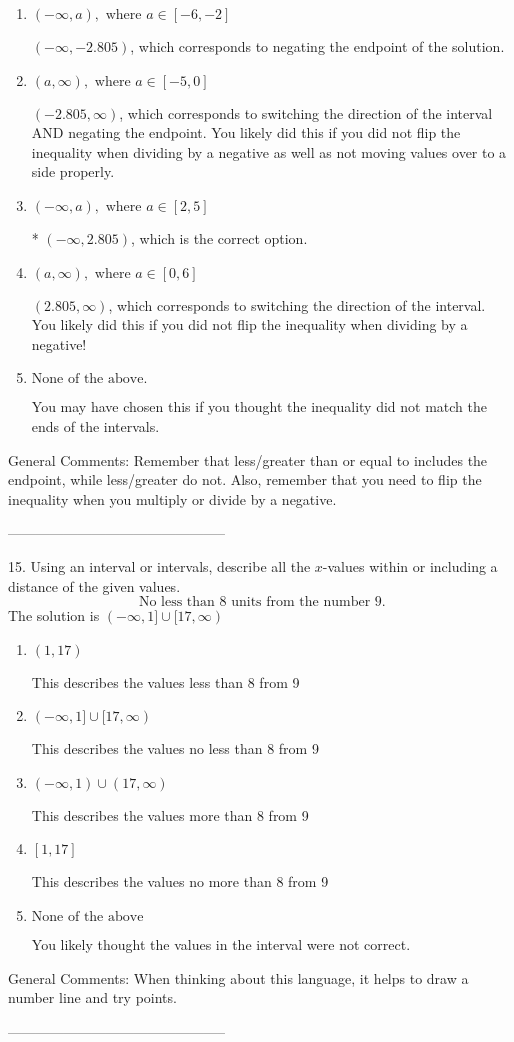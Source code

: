 \documentclass{article}[14pt]
\begin{document}
\begin{enumerate}[label=\Alph*.] 
\item $ (-\infty, a), \text{ where } a \in [-6, -2] $ 

  $(-\infty, -2.805)$, which corresponds to negating the endpoint of the solution. 
\item $ (a, \infty), \text{ where } a \in [-5, 0] $ 

  $(-2.805, \infty)$, which corresponds to switching the direction of the interval AND negating the endpoint. You likely did this if you did not flip the inequality when dividing by a negative as well as not moving values over to a side properly. 
\item $ (-\infty, a), \text{ where } a \in [2, 5] $ 

 * $(-\infty, 2.805)$, which is the correct option. 
\item $ (a, \infty), \text{ where } a \in [0, 6] $ 

  $(2.805, \infty)$, which corresponds to switching the direction of the interval. You likely did this if you did not flip the inequality when dividing by a negative! 
\item $ \text{None of the above}. $ 

 You may have chosen this if you thought the inequality did not match the ends of the intervals. 
\end{enumerate} 
 
General Comments: Remember that less/greater than or equal to includes the endpoint, while less/greater do not. Also, remember that you need to flip the inequality when you multiply or divide by a negative.

-----------------------------------------------

15. Using an interval or intervals, describe all the $x$-values within or including a distance of the given values.
$$ \text{ No less than } 8 \text{ units from the number } 9. $$ 
The solution is $ (-\infty, 1] \cup [17, \infty) $ 

\begin{enumerate}[label=\Alph*.] 
\item $ (1, 17) $ 

 This describes the values less than 8 from 9 
\item $ (-\infty, 1] \cup [17, \infty) $ 

 This describes the values no less than 8 from 9 
\item $ (-\infty, 1) \cup (17, \infty) $ 

 This describes the values more than 8 from 9 
\item $ [1, 17] $ 

 This describes the values no more than 8 from 9 
\item $ \text{None of the above} $ 

 You likely thought the values in the interval were not correct. 
\end{enumerate} 
 
General Comments: When thinking about this language, it helps to draw a number line and try points.

-----------------------------------------------
\end{document}
